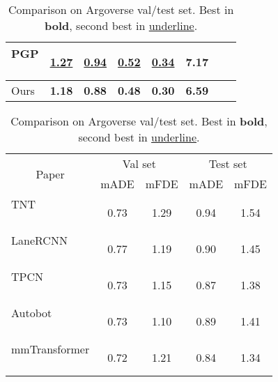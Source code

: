 \documentclass{article} \usepackage{iclr2023_conference,times}
\begin{document}
\begin{table}[]
\begin{minipage}{.45\linewidth}
{\begin{tabular}{l|ccccccc}
\rule{0pt}{9pt} \makecell[l]{PGP \\ ~\cite{deo2022multimodal}}         & \underline{1.27}          & \underline{0.94}          & \underline{0.52}          & \underline{0.34}          & 7.17                   \\ \hline
\rule{0pt}{9pt} Ours         & \textbf{1.18} & \textbf{0.88} & \textbf{0.48} & \textbf{0.30} & \textbf{6.59} \\ 
        \bottomrule
    \end{tabular}
    }
\end{minipage}
\hfill
\begin{minipage}{.45\linewidth}
\renewcommand{\tabcolsep}{1mm}
\renewcommand{\arraystretch}{1}
\caption{Comparison on Argoverse val/test set. Best in \textbf{bold}, second best in \underline{underline}.}
\label{tab:quantitative_argo}
      \centering
      {\scriptsize
        \begin{tabular}{l|cc|cc}
        \toprule
        \multicolumn{1}{c|}{\multirow{2}{*}{Paper}} & \multicolumn{2}{c|}{Val set}        & \multicolumn{2}{c}{Test set}        \\ \cline{2-5} 
        \multicolumn{1}{c|}{}                       & mADE         & mFDE         & mADE         & mFDE         \\ \hline
        \rule{0pt}{9pt}\makecell[l]{TNT \\ ~\cite{zhao2021tnt}}                                         & 0.73             & 1.29             & 0.94             & 1.54             \\
\rule{0pt}{9pt}\makecell[l]{LaneRCNN \\ ~\cite{zeng2021lanercnn}}                                    & 0.77             & 1.19             & 0.90             & 1.45             \\
        \rule{0pt}{9pt}\makecell[l]{TPCN \\ ~\cite{ye2021tpcn}}                                        & 0.73             & 1.15             & 0.87             & 1.38             \\
        \rule{0pt}{9pt}\makecell[l]{Autobot \\ ~\cite{girgis2021latent}}                                & 0.73             & 1.10             & 0.89             & 1.41             \\
        \rule{0pt}{9pt}\makecell[l]{mmTransformer \\ ~\cite{liu2021multimodal}}                                & 0.72             & 1.21             & 0.84             & 1.34             \\

\end{tabular}}
\end{minipage}
\end{table}
\end{document}
